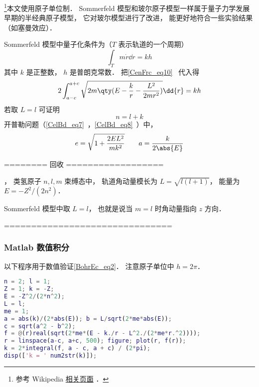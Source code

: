 
\begin{issues}
\issueDraft
\end{issues}


\footnote{参考 Wikipedia \href{https://en.wikipedia.org/wiki/Old_quantum_theory}{相关页面}
．}本文使用原子单位制． Sommerfeld 模型和玻尔原子模型一样属于量子力学发展早期的半经典原子模型， 它对玻尔模型进行了改进， 能更好地符合一些实验结果（如塞曼效应）． 

Sommerfeld 模型中量子化条件为（$T$ 表示轨道的一个周期）
\begin{equation}
\int_T m\dot r \dd{r} = kh
\end{equation}
其中 $k$ 是正整数， $h$ 是普朗克常数． 把\autoref{CenFrc_eq10}~ 代入得
\begin{equation}\label{BohrEc_eq1}
2\int_{a-c}^{a+c} \sqrt{2m\qty(E - \frac{k}{r} - \frac{L^2}{2mr^2})} \dd{r} = kh
\end{equation}
若取 $L = l$ 可证明
\begin{equation}\label{BohrEc_eq2}
n = l + k
\end{equation}
开普勒问题（\autoref{CelBd_eq7}~，\autoref{CelBd_eq8}~）中，
\begin{equation}
e = \sqrt{1 + \frac{2EL^2}{mk^2}}
\qquad
a = \frac{k}{2\abs{E}}
\end{equation}

======== 回收 ==================

， 类氢原子 $n,l,m$ 束缚态中， 轨道角动量模长为 $L = \sqrt{l(l+1)}$， 能量为 $E = -Z^2/(2n^2)$．

Sommerfeld 模型中取 $L = l$， 也就是说当 $m = l$ 时角动量指向 $z$ 方向．

===============================

\subsubsection{Matlab 数值积分}
以下程序用于数值验证\autoref{BohrEc_eq2}． 注意原子单位中 $h = 2\pi$．
\begin{lstlisting}[language=matlab]
n = 2; l = 1;
Z = 1; k = -Z;
E = -Z^2/(2*n^2);
L = l;
me = 1;
a = abs(k)/(2*abs(E)); b = L/sqrt(2*me*abs(E));
c = sqrt(a^2 - b^2);
f = @(r)real(sqrt(2*me*(E - k./r - L^2./(2*me*r.^2))));
r = linspace(a-c, a+c, 500); figure; plot(r, f(r));
k = 2*integral(f, a - c, a + c) / (2*pi);
disp(['k = ' num2str(k)]);
\end{lstlisting}
